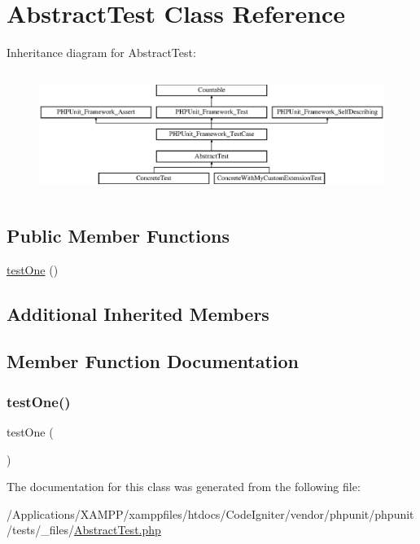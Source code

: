 \hypertarget{class_abstract_test}{}\section{Abstract\+Test Class Reference}
\label{class_abstract_test}
Inheritance diagram for Abstract\+Test\+:\begin{figure}[H]
\begin{center}
\leavevmode
\includegraphics[height=4.022989cm]{class_abstract_test}
\end{center}
\end{figure}
\subsection*{Public Member Functions}
\begin{DoxyCompactItemize}
\item 
\mbox{\hyperlink{class_abstract_test_afbf3ff88b322c6a7197ce02297cd23a0}{test\+One}} ()
\end{DoxyCompactItemize}
\subsection*{Additional Inherited Members}


\subsection{Member Function Documentation}
\mbox{\label{class_abstract_test_afbf3ff88b322c6a7197ce02297cd23a0}} 
\subsubsection{\texorpdfstring{test\+One()}{testOne()}}
{\footnotesize\ttfamily test\+One (\begin{DoxyParamCaption}{ }\end{DoxyParamCaption})}



The documentation for this class was generated from the following file\+:\begin{DoxyCompactItemize}
\item 
/\+Applications/\+X\+A\+M\+P\+P/xamppfiles/htdocs/\+Code\+Igniter/vendor/phpunit/phpunit/tests/\+\_\+files/\mbox{\hyperlink{_abstract_test_8php}{Abstract\+Test.\+php}}\end{DoxyCompactItemize}
